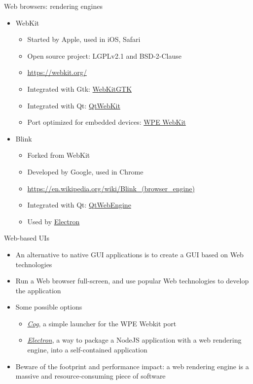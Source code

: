 \begin{frame}{Web browsers: rendering engines}
  \begin{itemize}
  \item WebKit
    \begin{itemize}
    \item Started by Apple, used in iOS, Safari
    \item Open source project: LGPLv2.1 and BSD-2-Clause
    \item \url{https://webkit.org/}
    \item Integrated with Gtk: \href{https://webkitgtk.org/}{WebKitGTK}
    \item Integrated with Qt: \href{https://wiki.qt.io/Qt_WebKit}{QtWebKit}
    \item Port optimized for embedded devices: \href{https://wpewebkit.org/}{WPE WebKit}
    \end{itemize}
  \item Blink
    \begin{itemize}
    \item Forked from WebKit
    \item Developed by Google, used in Chrome
    \item \url{https://en.wikipedia.org/wiki/Blink_(browser_engine)}
    \item Integrated with Qt: \href{https://wiki.qt.io/QtWebEngine}{QtWebEngine}
    \item Used by \href{https://www.electronjs.org/}{Electron}
    \end{itemize}
  \end{itemize}
\end{frame}

\begin{frame}{Web-based UIs}
  \begin{itemize}
  \item An alternative to native GUI applications is to create a GUI
    based on Web technologies
  \item Run a Web browser full-screen, and use popular Web
    technologies to develop the application
  \item Some possible options
    \begin{itemize}
    \item {\em \href{https://github.com/Igalia/cog}{Cog}},
      a simple launcher for the WPE Webkit port
    \item {\em \href{https://www.electronjs.org/}{Electron}},
      a way to package a NodeJS application with a
      web rendering engine, into a self-contained application
    \end{itemize}
  \item Beware of the footprint and performance impact: a web
    rendering engine is a massive and resource-consuming piece of
    software
  \end{itemize}
\end{frame}

